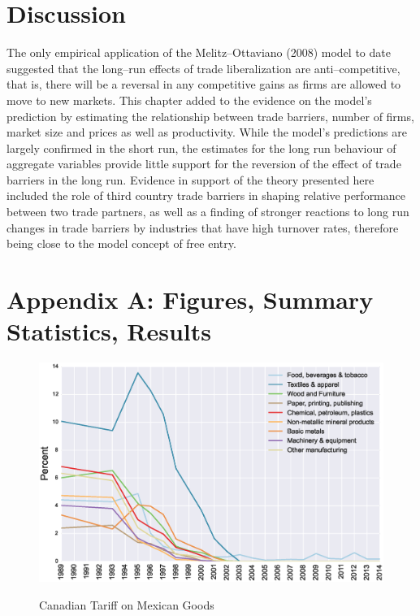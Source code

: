 \section{Discussion}\label{sec:conc}
The only empirical application of the Melitz--Ottaviano (2008) model to date 
suggested that the long--run effects of trade liberalization are anti--competitive,
 that is, there will be a reversal in any competitive gains as firms are allowed
 to move to new markets. This chapter added to the evidence on the model's
prediction by estimating the relationship between trade barriers, number of 
firms, market size and prices as well as productivity. While the model's 
predictions are largely confirmed in the short run, the estimates for the 
long run behaviour of aggregate variables provide little support for the 
reversion of the effect of trade barriers in the long run. Evidence in support
of the theory presented here included the role of third country trade barriers
in shaping relative performance between two trade partners, as well as a finding
of stronger reactions to long run changes in trade barriers by industries that
have high turnover rates, therefore being close to the model concept of free entry.

\newpage

\section{Appendix A: Figures, Summary Statistics, Results}

\begin{figure}[!ht]\centering
\caption{Canadian Tariff on Mexican Goods}
\includegraphics[scale=0.5]{tau_can_mex}
\label{fig:can_mex}
\end{figure} 

